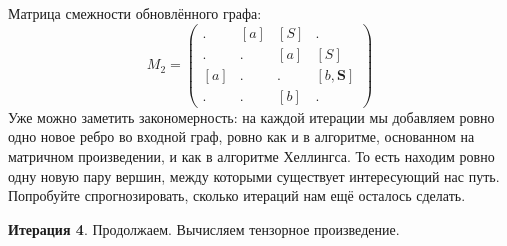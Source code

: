 \begin{example}
Матрица смежности обновлённого графа:
\[ M_2 =
\begin{pmatrix}
. & [a] & [S] & . \\
. & . & [a] & [S] \\
[a] & . & . & [b, \textbf{S}] \\
. & . & [b] & .
\end{pmatrix}
\]
Уже можно заметить закономерность: на каждой итерации мы добавляем ровно одно новое ребро во входной граф, ровно как и в алгоритме, основанном на матричном произведении, и как в алгоритме Хеллингса.
То есть находим ровно одну новую пару вершин, между которыми существует интересующий нас путь.
Попробуйте спрогнозировать, сколько итераций нам ещё осталось сделать.

\textbf{Итерация 4}.
Продолжаем. Вычисляем тензорное произведение.


\end{example}
